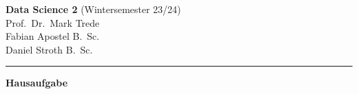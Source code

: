 \documentclass[12pt]{scrartcl}
\begin{document}
\noindent
{\small{\textbf {Data Science 2}} (Wintersemester 23/24)\hfill \woche \\
Prof.~Dr.~Mark Trede\\
Fabian Apostel B.~Sc.\\
Daniel Stroth B.~Sc.}
\vspace{0.1cm}
\hrule


\vspace{0,5cm}
\begin{center}
{\Large{\textbf {Hausaufgabe \nr}}}\\[0.3cm] 
{\small{\textit {\thema}}}\\[1cm]
\end{center}
\end{document}
